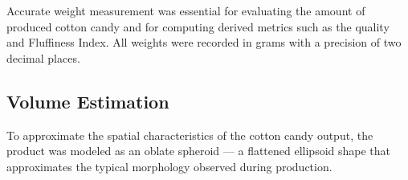 Accurate weight measurement was essential for evaluating the amount of produced cotton candy and for computing derived metrics such as the quality and Fluffiness Index. All weights were recorded in grams with a precision of two decimal places.




\subsection{Volume Estimation}

To approximate the spatial characteristics of the cotton candy output, the product was modeled as an oblate spheroid — a flattened ellipsoid shape that approximates the typical morphology observed during production.

